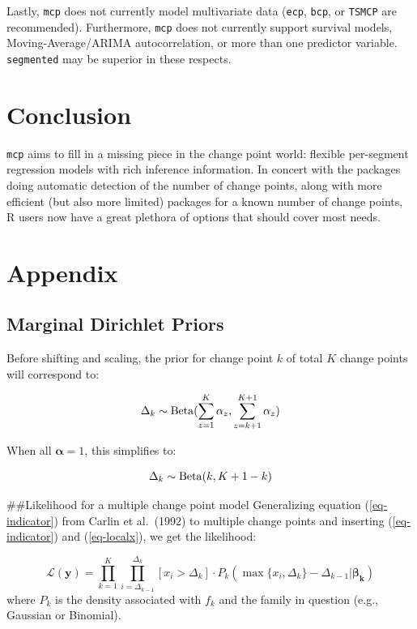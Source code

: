 \documentclass[
  american,
]{article}
\begin{document}
Lastly, \texttt{mcp} does not currently model multivariate data (\texttt{ecp}, \texttt{bcp}, or \texttt{TSMCP} are recommended). Furthermore, \texttt{mcp} does not currently support survival models, Moving-Average/ARIMA autocorrelation, or more than one predictor variable. \texttt{segmented} may be superior in these respects.

\hypertarget{conclusion}{%
\section{Conclusion}\label{conclusion}}

\texttt{mcp} aims to fill in a missing piece in the change point world: flexible per-segment regression models with rich inference information. In concert with the packages doing automatic detection of the number of change points, along with more efficient (but also more limited) packages for a known number of change points, R users now have a great plethora of options that should cover most needs.

\hypertarget{appendix}{%
\section{Appendix}\label{appendix}}

\hypertarget{marginal-dirichlet-priors}{%
\subsection{Marginal Dirichlet Priors}\label{marginal-dirichlet-priors}}

Before shifting and scaling, the prior for change point \(k\) of total \(K\) change points will correspond to:

\[
\Delta_k \sim {\rm Beta}(\sum_{z = 1}^K \alpha_z, \sum_{z=k+1}^{K+1} \alpha_z)
\]

When all \(\mathbf{\alpha} = 1\), this simplifies to:

\[
\Delta_k \sim {\rm Beta}(k, K + 1 - k)
\]

\#\#Likelihood for a multiple change point model
Generalizing equation (\ref{eq-indicator}) from Carlin et al.~(1992) to multiple change points and inserting (\ref{eq-indicator}) and (\ref{eq-localx}), we get the likelihood:

\[
\mathcal{L}(\mathbf{y}) = \prod_{k = 1}^K\prod_{i = \Delta_{k-1}}^{\Delta_k} [x_i > \Delta_k]\cdot P_k(\max\{x_i, \Delta_k\} - \Delta_{k-1}|\mathbf{\beta_k})
\]
where \(P_k\) is the density associated with \(f_k\) and the family in question (e.g., Gaussian or Binomial).

\renewcommand\refname{References}
  
\end{document}
